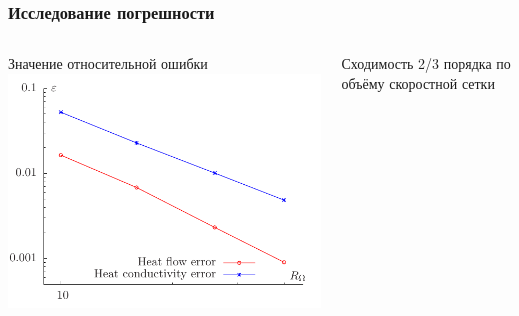 \documentclass[ucs]{beamer}
\begin{document}
\begin{frame}
	\frametitle{Исследование погрешности}
	\begin{columns}
		\begin{center}
			Значение относительной ошибки\\
			\includegraphics[width=\textwidth]{pics/error}
		\end{center}
		\begin{center}
			Сходимость 2/3 порядка по объёму скоростной сетки
		\end{center}
	\end{columns}
\end{frame}
\end{document}
